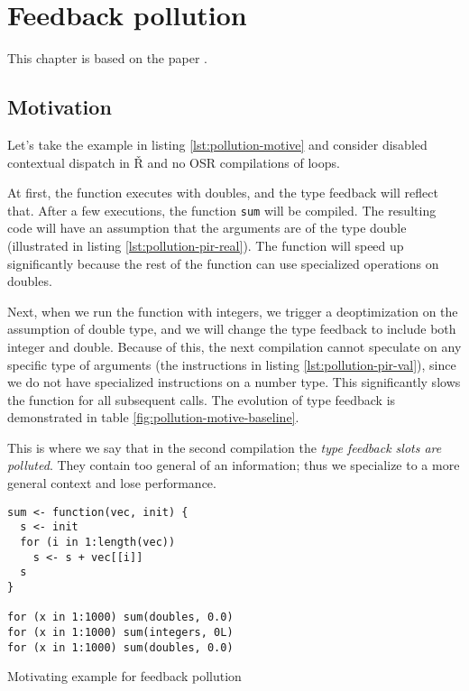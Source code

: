 \chapter{Feedback pollution}

\begin{chapterabstract}
	\todoadd
\end{chapterabstract}

This chapter is based on the paper \todocite.

\section{Motivation}

Let's take the example in listing \ref{lst:pollution-motive} and consider disabled contextual dispatch in Ř and no OSR compilations of loops.

At first, the function executes with doubles, and the type feedback will reflect that. After a few executions, the function \texttt{sum} will be compiled. The resulting code will have an assumption that the arguments are of the type double (illustrated in listing \ref{lst:pollution-pir-real}). The function will speed up significantly because the rest of the function can use specialized operations on doubles.

Next, when we run the function with integers, we trigger a deoptimization on the assumption of double type, and we will change the type feedback to include both integer and double. Because of this, the next compilation cannot speculate on any specific type of arguments (the instructions in listing \ref{lst:pollution-pir-val}), since we do not have specialized instructions on a number type. This significantly slows the function for all subsequent calls. The evolution of type feedback is demonstrated in table \ref{fig:pollution-motive-baseline}.

This is where we say that in the second compilation the \textit{type feedback slots are polluted}. They contain too general of an information; thus we specialize to a more general context and lose performance.

\begin{listing}
	\begin{verbatim}
sum <- function(vec, init) {
  s <- init
  for (i in 1:length(vec))
    s <- s + vec[[i]]
  s
}

for (x in 1:1000) sum(doubles, 0.0)
for (x in 1:1000) sum(integers, 0L)
for (x in 1:1000) sum(doubles, 0.0)
  \end{verbatim}
	\caption{Motivating example for feedback pollution}\label{lst:pollution-motive}
\end{listing}

